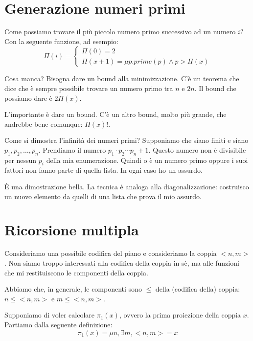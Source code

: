 \section{Generazione numeri primi}

Come possiamo trovare il più piccolo numero primo successivo ad un numero $i$? Con la seguente
funzione, ad esempio:
\begin{equation*}
    \Pi(i) = 
    \begin{cases}
        \Pi(0) = 2 \\
        \Pi(x + 1) = \mu p. \textit{prime}(p) \land p > \Pi(x)
    \end{cases}
\end{equation*}

Cosa manca? Bisogna dare un bound alla minimizzazione. C'è un teorema che dice che è sempre
possibile trovare un numero primo tra $n$ e $2n$. Il bound che possiamo dare è $2\Pi(x)$.

L'importante è dare un bound. C'è un altro bound, molto più grande, che andrebbe bene comunque:
$\Pi(x)!$.

Come si dimostra l'infinità dei numeri primi? Supponiamo che siano finiti e siano $p_{1}, p_{2},
\dotsc, p_{n}$. Prendiamo il numero $p_{1}\cdot p_{2}\cdots p_{n} + 1$. Questo numero non è
divisibile per nessun $p_{i}$ della mia enumerazione. Quindi o è un numero primo oppure i suoi
fattori non fanno parte di quella lista. In ogni caso ho un assurdo.

È una dimostrazione bella. La tecnica è analoga alla diagonalizzazione: costruisco un nuovo
elemento da quelli di una lista che prova il mio assurdo.

\section{Ricorsione multipla}

Consideriamo una possibile codifica del piano e consideriamo la coppia $<n,m>$. Non siamo troppo
interessati alla codifica della coppia in sè, ma alle funzioni che mi restituiscono le componenti
della coppia.

Abbiamo che, in generale, le componenti sono $\leq$ della (codifica della) coppia: $n \leq <n,m>$ e
$m \leq <n,m>$.

Supponiamo di voler calcolare $\pi_{1}(x)$, ovvero la prima proiezione della coppia $x$. Partiamo
dalla seguente definizione:
\begin{equation*}
    \pi_{1}(x) = \mu n, \exists m, <n,m> = x
\end{equation*}

